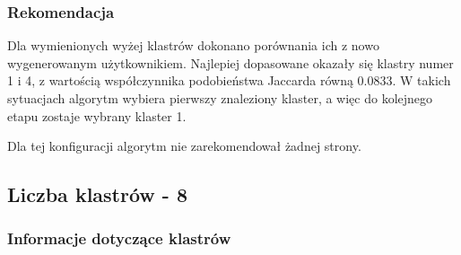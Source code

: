 \documentclass{classrep}
\begin{document}
\subsubsection{Rekomendacja}
Dla wymienionych wyżej klastrów dokonano porównania ich z nowo wygenerowanym użytkownikiem. Najlepiej dopasowane okazały się klastry numer 1 i 4, z wartością współczynnika podobieństwa Jaccarda równą 0.0833. W takich sytuacjach algorytm wybiera pierwszy znaleziony klaster, a więc do kolejnego etapu zostaje wybrany klaster 1.

\begin{table}[H]
\centering
\caption{Wartości współczynnika podobieństwa Jaccarda dla nowego użytkownika i każdego klastra}
\label{tab:apriori_num_params}
\end{table}
Dla tej konfiguracji algorytm nie zarekomendował żadnej strony.

\newpage
\subsection{Liczba klastrów - 8}
\subsubsection{Informacje dotyczące klastrów}

\begin{table}[H]
\centering
\caption{Wynik analizy skupień dla ośmiu klastrów.}
\label{tab:apriori_num_params}
\end{table}
\end{document}

